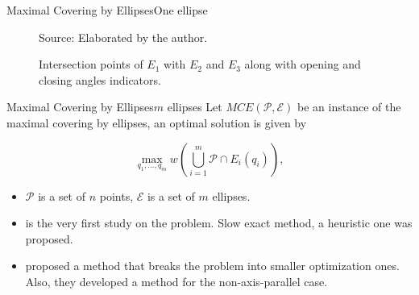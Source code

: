 \documentclass{beamer}
\newcommand{\Pp}{\mathscr{P}}
\newcommand{\E}{\mathscr{E}}
\newcommand{\source}[1]{\caption*{Source: {#1}} }
\begin{document}
\begin{frame}{Maximal Covering by Ellipses}{One ellipse}
\begin{figure}[H]
	\centering
	
	\caption{Intersection points of $E_1$ with $E_2$ and $E_3$ along with opening and closing angles indicators.}
	
	\source{Elaborated by the author.}
	\label{fig:3ellipses_with_gammas}
\end{figure}
\end{frame}


\begin{frame}{Maximal Covering by Ellipses}{$m$ ellipses}
	Let $MCE(\Pp, \E)$ be an instance of the maximal covering by ellipses, an optimal solution is given by
	
	\begin{equation*}
	\max_{q_1, \dots, q_m}{w(\bigcup_{i=1}^{m} \Pp \cap E_i(q_i))},
	\end{equation*}
	
	\begin{itemize}
		\item $\Pp$ is a set of $n$ points, $\E$ is a set of $m$ ellipses.
		\item \autocite{canbolat} is the very first study on the problem. Slow exact method, a heuristic one was proposed.
		\item \autocite{andreta} proposed a method that breaks the problem into smaller optimization ones. Also, they developed a method for the non-axis-parallel case.
	\end{itemize}
\end{frame}
\end{document}
